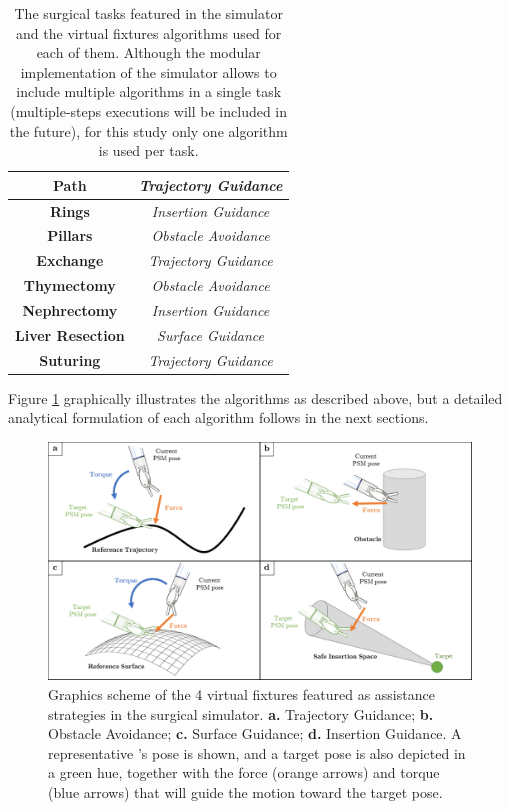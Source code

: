 \documentclass[../main.tex]{subfiles}
\begin{document}
\begin{table}
    \caption{The surgical tasks featured in the simulator and the virtual fixtures algorithms used for each of them. Although the modular implementation of the simulator allows to include multiple \vf algorithms in a single task (multiple-steps executions will be included in the future), for this study only one \vf algorithm is used per task.}
    \centering
    \begin{tabular}{||c|c||}
        \hline
        \textbf{Path} & \textit{Trajectory Guidance} \\
        \hline
        \textbf{Rings} & \textit{Insertion Guidance} \\
        \hline
        \textbf{Pillars} & \textit{Obstacle Avoidance} \\
        \hline
        \textbf{Exchange} & \textit{Trajectory Guidance} \\
        \hline
        \textbf{Thymectomy} & \textit{Obstacle Avoidance}  \\
        \hline
        \textbf{Nephrectomy} & \textit{Insertion Guidance} \\
        \hline
        \textbf{Liver Resection} & \textit{Surface Guidance} \\
        \hline
        \textbf{Suturing} & \textit{Trajectory Guidance} \\
        \hline
    \end{tabular}
    \label{tab:taskswithvfs}
\end{table}
Figure \ref{fig:vfsgraphics} graphically illustrates the \vf algorithms as described above, but a detailed analytical formulation of each algorithm follows in the next sections.

\begin{figure}
    \centering
    \includegraphics[width=\textwidth]{images/vfs_graphics.png}
    \caption{Graphics scheme of the 4 virtual fixtures featured as assistance strategies in the surgical simulator. \textbf{a.} Trajectory Guidance; \textbf{b.} Obstacle Avoidance; \textbf{c.} Surface Guidance; \textbf{d.} Insertion Guidance. A representative \psm's pose is shown, and a target pose is also depicted in a green hue, together with the force (orange arrows) and torque (blue arrows) that will guide the motion toward the target pose.}
    \label{fig:vfsgraphics}
\end{figure}
\end{document}
